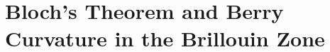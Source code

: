 \section{Bloch's Theorem and Berry Curvature in the Brillouin Zone}
\label{sec:bloch_berry_brillouin}

